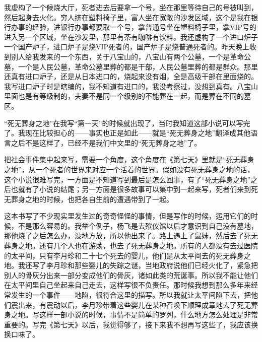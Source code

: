 \documentclass[12pt,a5paper]{ctexbook}
\begin{document}
我虚构了一个候烧大厅，死者进去后要拿一个号，坐在那里等待自己的号被叫到，然后起身去火化。穷人挤在塑料椅子里，富人坐在宽敞的沙发区域，这个是我在银行办事的经验，进银行办事都要取一个号，拿普通号坐在塑料椅子里，拿VIP号的进入另一个区域，坐在沙发里，那里有茶有咖啡有饮料。我还虚构了一个进口炉子一个国产炉子，进口炉子是烧VIP死者的，国产炉子是烧普通死者的。昨天晚上收到别人给我发来的一个东西，关于八宝山的，八宝山有两个公墓，一个是革命公墓，一个是人民公墓，革命公墓里葬的都是干部，人民公墓里葬的都是群众。那里还真有进口炉子，还是从日本进口的，烧起来没有烟，全是高级干部在里面烧的。我写进口炉子时是瞎编的，我不知道有进口的，我没考察过，没想到真有。八宝山里面也是有等级制的，夫妻不是同一个级别的不能葬在一起，而是葬在不同的墓区。

“死无葬身之地”在我写“第一天”的时候就出现了，当时我知道这部小说可以写完了。我现在比较担心的——事实也正是如此——就是“死无葬身之地”翻译成其他语言之后不是这样了，已经不是我们中文里的“死无葬身之地”了。

把社会事件集中起来写，需要一个角度，这个角度在《第七天》里就是“死无葬身之地”，从一个死者的世界来对应一个活着的世界。假如没有死无葬身之地的话，这个小说很难写完，一方面是不知道写到最后是怎么回事，有了“死无葬身之地”之后也就有了小说的结尾；另一方面是很多故事可以集中到一起来写，死者们来到死无葬身之地的时候，也把各自生前的遭遇带到了一起。

这本书写了不少现实里发生过的奇奇怪怪的事情，但是写作的时候，运用它们的时候，不是那么容易的。我举个例子，杨飞是去殡仪馆以后才意识到自己没有墓地，那他烧了之后怎么办，没地方放，所以他出来了。路上遇上了鼠妹，然后去了死无葬身之地。还有几个人也在游荡，也去了死无葬身之地。所有的人都没有去过医院的太平间，只有李月珍和二十七个死去的婴儿，他们是从太平间去的死无葬身之地。我还写了李月珍和那些婴儿的失踪之谜，当地政府说他们已经火化了，紧急把别人的骨灰分出来一部分变成他们的骨灰，诸如此类的荒诞事。所以我不能让他们在太平间里自己坐起来自己走去，这样写很不负责任。那时候我想到那么多年来经常发生的一个事件——地陷，很符合这里的描写。所以我就让太平间陷下去，把他们震出来，有震动以后，李月珍带着这些婴儿在某种召唤下顺理成章地去了死无葬身之地。写这样一部小说的时候，事情不是简单的罗列，什么地方怎么处理是非常重要的。写完《第七天》以后，我觉得够了，接下来我不想再写这些了，我应该换换口味了。
\end{document}
